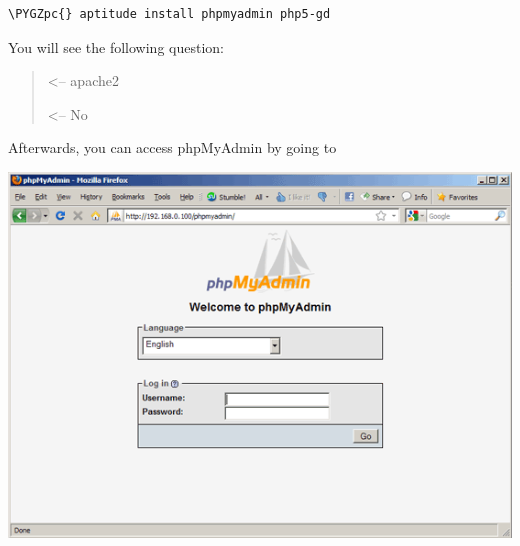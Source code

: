 \documentclass[letterpaper,10pt,english]{sphinxmanual}
\def\PYGZpc{\char`\%}
\begin{document}
\begin{Verbatim}[commandchars=\\\{\},formatcom=\footnotesize]
\PYGZpc{} aptitude install phpmyadmin php5-gd
\end{Verbatim}

You will see the following question:
\begin{quote}

\begin{DUlineblock}{0em}
\item[]  \textless{}-- apache2
\item[]  \textless{}-- No
\end{DUlineblock}
\end{quote}

Afterwards, you can access phpMyAdmin by going to

\includegraphics{phpMyAdmin.png}
\end{document}

